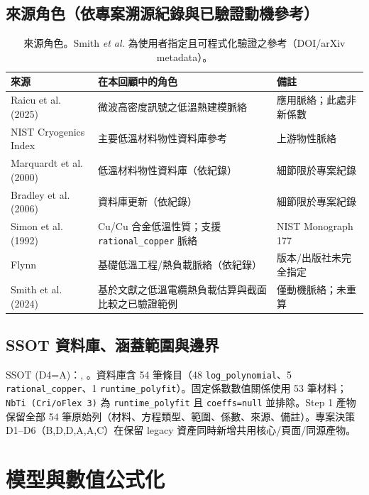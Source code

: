 \documentclass[11pt,a4paper]{article}
\begin{document}
\subsection{來源角色（依專案溯源紀錄與已驗證動機參考）}
\begin{table}[h]
\centering
\small
\begin{tabular}{@{}p{4.1cm}p{6.9cm}p{3.8cm}@{}}
\toprule
來源 & 在本回顧中的角色 & 備註 \\
\midrule
Raicu et al. (2025) \cite{raicu2025} & 微波高密度訊號之低溫熱建模脈絡 & 應用脈絡；此處非新係數 \\
NIST Cryogenics Index \cite{nist} & 主要低溫材料物性資料庫參考 & 上游物性脈絡 \\
Marquardt et al. (2000) \cite{marquardt} & 低溫材料物性資料庫（依紀錄） & 細節限於專案紀錄 \\
Bradley et al. (2006) \cite{bradley} & 資料庫更新（依紀錄） & 細節限於專案紀錄 \\
Simon et al. (1992) \cite{simon1992} & Cu/Cu 合金低溫性質；支援 \texttt{rational\_copper} 脈絡 & NIST Monograph 177 \\
Flynn \cite{flynn} & 基礎低溫工程/熱負載脈絡（依紀錄） & 版本/出版社未完全指定 \\
Smith et al. (2024) \cite{smith2024} & 基於文獻之低溫電纜熱負載估算與截面比較之已驗證範例 & 僅動機脈絡；未重算 \\
\bottomrule
\end{tabular}
\caption{來源角色。Smith \textit{et al.} 為使用者指定且可程式化驗證之參考（DOI/arXiv metadata）。}
\end{table}

\subsection{SSOT 資料庫、涵蓋範圍與邊界}
SSOT (D4=A)：, 。資料庫含 54 筆條目（48 \texttt{log\_polynomial}、5 \texttt{rational\_copper}、1 \texttt{runtime\_polyfit}）。固定係數數值關係使用 53 筆材料；\texttt{NbTi (Cri/oFlex 3)} 為 \texttt{runtime\_polyfit} 且 \texttt{coeffs=null} 並排除。Step 1 產物保留全部 54 筆原始列（材料、方程類型、範圍、係數、來源、備註）。專案決策 D1--D6（B,D,D,A,A,C）在保留 legacy 資產同時新增共用核心/頁面/同源產物。

\section{模型與數值公式化}
\end{document}
